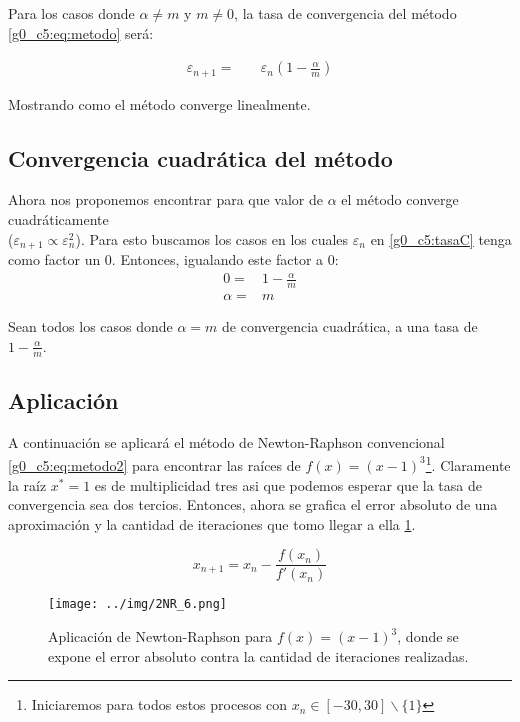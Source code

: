 \documentclass[../portafolio.tex]{subfiles}
\begin{document}
Para los casos donde $\alpha \neq m$ y $m\neq 0$, la tasa de convergencia del método \eqref{g0_c5:eq:metodo} será:


\begin{align}
\varepsilon_{n+1} =&  \quad \varepsilon_n \left(1 - \frac{\alpha}{m} \right) \label{g0_c5:tasaC}
\end{align}


Mostrando como el método converge linealmente.


\subsection{Convergencia cuadrática del método}


Ahora nos proponemos encontrar para que valor de $\alpha$ el método converge cuadráticamente \\
($\varepsilon_{n+1}\propto \varepsilon_n^2$).
Para esto buscamos los casos en los cuales $\varepsilon_n$ en \eqref{g0_c5:tasaC} tenga como factor un 0. Entonces, igualando este factor a 0:
\begin{align}
0=&1-\frac{\alpha}{m}\\
\alpha=& m
\end{align}


Sean todos los casos donde $\alpha=m$ de convergencia cuadrática, a una tasa de $1-\frac{\alpha}{m}$.


\subsection{Aplicación}
A continuación se aplicará el método de Newton-Raphson convencional \eqref{g0_c5:eq:metodo2} para encontrar las raíces de $f(x)=(x-1)^3$\footnote{Iniciaremos para todos estos procesos con $x_n\in  [-30,30] \backslash \{1\}$}. Claramente la raíz $x^*=1$ es de multiplicidad tres asi que podemos esperar que la tasa de convergencia sea dos tercios. Entonces, ahora se grafica el error absoluto de una aproximación y la cantidad de iteraciones que tomo llegar a ella \ref{g0_c5:fig:graf_c}.


\begin{equation} \label{g0_c5:eq:metodo2}
x_{n+1}=x_n -  \frac{f(x_n)}{f'(x_n)}
\end{equation}


\begin{figure}
\centering
\texttt{[image: ../img/2NR\_6.png]}
\caption{Aplicación de Newton-Raphson para $f(x)=(x-1)^3$, donde se expone el error absoluto contra la cantidad de iteraciones realizadas.} \label{g0_c5:fig:graf_c}
\end{figure}
\end{document}
